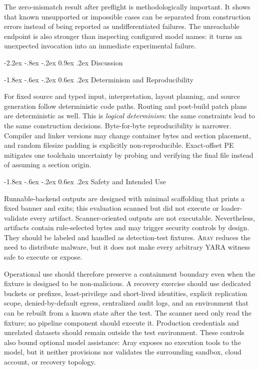 \documentclass[11pt,twocolumn]{article}
\makeatletter
\newcommand{\tool}{\textsc{Aray}\xspace}
\renewcommand\section{\@startsection{section}{1}{\z@}%
  {-2.2ex \@plus -.8ex \@minus -.2ex}%
  {0.9ex \@plus .2ex}%
  {\normalfont\large\bfseries}}
\renewcommand\subsection{\@startsection{subsection}{2}{\z@}%
  {-1.8ex \@plus -.6ex \@minus -.2ex}%
  {0.6ex \@plus .2ex}%
  {\normalfont\normalsize\bfseries}}
\makeatother
\begin{document}
The zero-mismatch result after preflight is methodologically important. It shows
that known unsupported or impossible cases can be separated from construction
errors instead of being reported as undifferentiated failures. The unreachable
endpoint is also stronger than inspecting configured model names: it turns an
unexpected invocation into an immediate experimental failure.

\section{Discussion}

\subsection{Determinism and Reproducibility}

For fixed source and typed input, interpretation, layout planning, and source
generation follow deterministic code paths. Routing and post-build patch plans
are deterministic as well. This is \emph{logical determinism}: the same
constraints lead to the same construction decisions.
Byte-for-byte reproducibility is narrower. Compiler and linker versions may
change container bytes and section placement, and random filesize padding is
explicitly non-reproducible. Exact-offset PE mitigates one toolchain uncertainty
by probing and verifying the final file instead of assuming a section origin.

\subsection{Safety and Intended Use}

Runnable-backend outputs are designed with minimal scaffolding that prints a
fixed banner and exits; this evaluation scanned but did not execute or
loader-validate every artifact. Scanner-oriented outputs are not executable.
Nevertheless, artifacts contain rule-selected bytes and may trigger security
controls by design. They should be labeled and handled as detection-test
fixtures. \tool reduces the need to distribute malware, but it does not make
every arbitrary YARA witness safe to execute or expose.

Operational use should therefore preserve a containment boundary even when the
fixture is designed to be non-malicious. A recovery exercise should use
dedicated buckets or prefixes, least-privilege and short-lived identities,
explicit replication scope, denied-by-default egress, centralized audit logs,
and an environment that can be rebuilt from a known state after the test. The
scanner need only read the fixture; no pipeline component should execute it.
Production credentials and unrelated datasets should remain outside the test
environment. These controls also bound optional model assistance: Aray exposes
no execution tools to the model, but it neither provisions nor validates the
surrounding sandbox, cloud account, or recovery topology.
\end{document}
